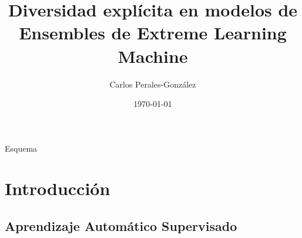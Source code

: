 \documentclass{beamer}
\title[Diversidad en ensembles de ELM]{Diversidad explícita en modelos de Ensembles de Extreme Learning Machine}
\author[C. Perales-González]
{   %
    Carlos Perales-Gonz\'alez
}
\institute[ULOYOLA]
{   %
\hfill
	
    \begin{tabular}{c}
    David Becerra-Alonso \\
    Francisco Fernández-Navarro \\
    Mariano Carbonero-Ruz \\        
    \end{tabular}

\hfill
}
\date
{   %
	\today
}
\begin{document}
\frame{\titlepage}

\begin{frame}{Esquema}
\tableofcontents
\end{frame}


\section{Introducción} %

%	
%	
%	
%

\subsection{Aprendizaje Automático Supervisado}

%
%	
\end{document}
